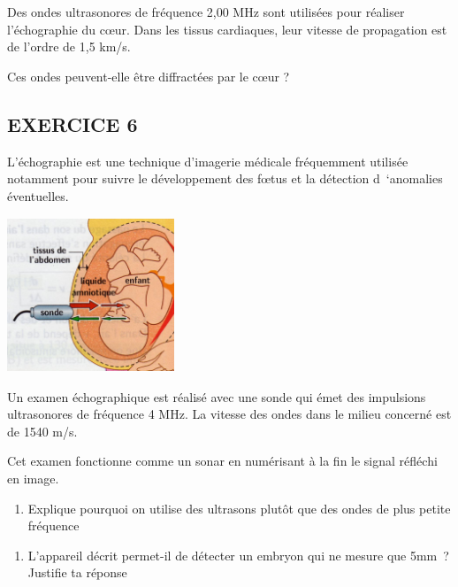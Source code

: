 {Des ondes ultrasonores de fréquence 2,00 MHz sont utilisées pour
réaliser l'échographie du cœur. Dans les tissus cardiaques, leur vitesse
de propagation est de l'ordre de 1,5 km/s.

Ces ondes peuvent-elle être diffractées par le cœur ?
\subsection{EXERCICE 6}

L'échographie est une technique d'imagerie médicale fréquemment utilisée
notamment pour suivre le développement des fœtus et la détection
d~`anomalies éventuelles.

\includegraphics[width=5.009cm,height=4.621cm]{Pictures/1000000000000301000002BCCF7FB7734DEACB0A.jpg}

Un examen échographique est réalisé avec une sonde qui émet des
impulsions ultrasonores de fréquence 4 MHz. La vitesse des ondes dans le
milieu concerné est de 1540 m/s.

Cet examen fonctionne comme un sonar en numérisant à la fin le signal
réfléchi en image.

\begin{enumerate}
\def\labelenumi{\alph{enumi})}
\tightlist
\item
  Explique pourquoi on utilise des ultrasons plutôt que des ondes de
  plus petite fréquence
\end{enumerate}

\begin{enumerate}
\def\labelenumi{\alph{enumi})}
\tightlist
\item
  L'appareil décrit permet-il de détecter un embryon qui ne mesure que
  5mm~? Justifie ta réponse
\end{enumerate}

}
